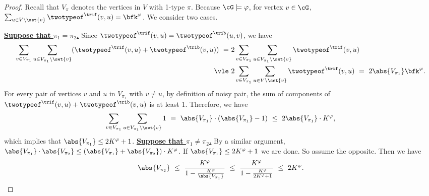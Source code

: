 \begin{proof}
    
    Recall that $V_{\pi}$ denotes the vertices in $V$ with 1-type $\pi$.
    Because $\cG \models \varphi$, for vertex $v \in \cG$,
    $\sum_{u \in V \setminus \set{v}} \twotypeof^\trif(v, u) = \bfk^\varphi$.
    We consider two cases.

    \textbf{\uline{Suppose that $\pi_1 = \pi_2$.}}
    Since $\twotypeof^\trif(v, u) = \twotypeof^\trib(u, v)$,
    we have
    \begin{equation*}
        \begin{aligned}
            \sum_{v \in V_{\pi_1}} \sum_{u \in V_{\pi_1} \setminus \set{v}}
            (\twotypeof^\trif(v, u) + \twotypeof^\trib(v, u))
            \ =\ &
            2 \sum_{v \in V_{\pi_1}} \sum_{u \in V_{\pi_1} \setminus \set{v}}
            \twotypeof^\trif(v, u) \\
            \ \vle\ &
            2 \sum_{v \in V_{\pi_1}} \sum_{u \in V \setminus \set{v}} \twotypeof^\trif(v, u)
            \ =\ 2\abs{V_{\pi_1}} \bfk^\varphi.
        \end{aligned}
    \end{equation*}
    For every pair of vertices $v$ and $u$ in $V_{\pi_1}$ with $v \neq u$,
    by definition of noisy pair,
    the sum of components of $\twotypeof^\trif(v, u) + \twotypeof^\trib(v, u)$ is at least $1$.
    Therefore, we have
    \begin{equation*}
        \sum_{v \in V_{\pi_1}} \sum_{u \in V_{\pi_1} \setminus \set{v}} 1
        \ =\ \abs{V_{\pi_1}}\cdot(\abs{V_{\pi_1}} - 1)
        \ \le\ 2\abs{V_{\pi_1}} \cdot K^\varphi,
    \end{equation*}
    which implies that $\abs{V_{\pi_1}} \le 2K^\varphi + 1$.     
    \textbf{\uline{Suppose that $\pi_1 \neq \pi_2$.}}
    By a similar argument, 
    $\abs{V_{\pi_1}} \cdot \abs{V_{\pi_2}} \le (\abs{V_{\pi_1}} + \abs{V_{\pi_2}}) \cdot K^\varphi$.
    If $\abs{V_{\pi_1}} \leq 2K^\varphi+1$ we are done. So assume the opposite.
    Then we have
    \begin{equation*}
        \abs{V_{\pi_2}}
        \ \le\ 
        \frac{K^\varphi}{1-\frac{K^\varphi}{\abs{V_{\pi_1}}}}
        \ \le\ 
        \frac{K^\varphi}{1-\frac{K^\varphi}{2K^\varphi + 1}}
        \ \le\ 
        2K^\varphi.
    \end{equation*}
\end{proof}


